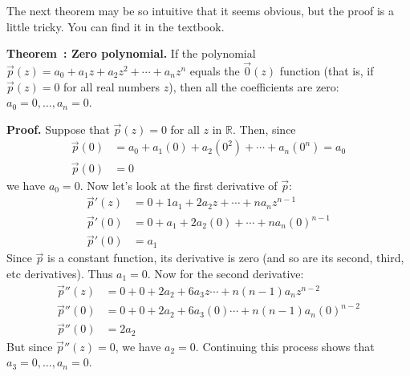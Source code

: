 \documentclass[11pt, letterpaper]{report}
\newenvironment{notes}{}{}
\newenvironment{book}{}{}
\newcounter{theorem}[chapter]
\newenvironment{theorem}[1][]{\refstepcounter{theorem}\begin{bbox}\par
    \noindent\textbf{Theorem~\thetheorem: #1}}{\end{bbox}}
\newlength\oldfboxsep%
\newlength\myminiwidth%
\newenvironment{bbox}{%
  \setlength\oldfboxsep\fboxsep
  \setlength{\fboxsep}{.1in}%
  \setlength\myminiwidth\linewidth%
  \addtolength\myminiwidth{-0.2in}%
  \vspace{0.1in}%
  \begin{lrbox}{\bboxbox}\begin{minipage}{\myminiwidth}%
    }{%
    \end{minipage}\end{lrbox}%
  \noindent\fbox{\usebox{\bboxbox}}\vspace{0.1in}\setlength\fboxsep\oldfboxsep%
}
\newcommand{\R}{\mathbb{R}}
\begin{document}
The next theorem may be so intuitive that it seems obvious, but the proof is a little tricky.
\begin{notes}
You can find it in the textbook.
\end{notes}

\begin{theorem}[Zero polynomial.]
\label{theorem:zero-polynomial} If the polynomial $\vec{p}(z) = a_0 + a_1z + a_2z^2 + \cdots + a_nz^n$ equals the $\vec{0}(z)$ function (that is, if $\vec{p}(z) = 0$ for all real numbers $z$), then all the coefficients are zero: $a_0=0, \ldots, a_n=0$.
\end{theorem}

\begin{book}
\textbf{Proof.} Suppose that $\vec{p}(z)=0$ for all $z$ in $\R$. Then, since 
\begin{align*}
\vec{p}(0) &= a_0+a_1(0) + a_2(0^2) + \cdots + a_n(0^n) = a_0 \\
\vec{p}(0) &= 0
\end{align*}
we have $a_0=0$. Now let's look at the first derivative of $\vec{p}$:
\begin{align*}
\vec{p}'(z) &= 0 + 1a_1 + 2a_2z + \cdots + na_nz^{n-1}  \\
\vec{p}'(0) &= 0 + a_1 + 2a_2(0) + \cdots + na_n(0)^{n-1}  \\
\vec{p}'(0) &= a_1
\end{align*}
Since $\vec{p}$ is a constant function, its derivative is zero (and so are its second, third, etc derivatives). Thus $a_1=0$. Now for the second derivative:
\begin{align*}
\vec{p}''(z) &= 0 + 0 + 2a_2 + 6a_3z\cdots + n(n-1)a_nz^{n-2}  \\
\vec{p}''(0) &= 0 + 0 + 2a_2 + 6a_3(0) \cdots + n(n-1)a_n(0)^{n-2}  \\
\vec{p}''(0) &= 2a_2
\end{align*}
But since $\vec{p}''(z)=0$, we have $a_2=0$. Continuing this process shows that $a_3=0,\ldots,a_n=0$.\blacksquare


\end{book}
\end{document}
